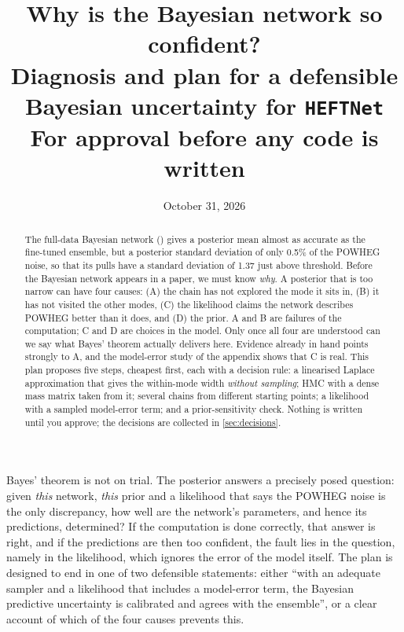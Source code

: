 
\newcommand{\what}{\hat{\boldsymbol{\omega}}}

\title{\textbf{Why is the Bayesian network so confident?}\\[4pt]
\large Diagnosis and plan for a defensible Bayesian uncertainty for \texttt{HEFTNet}\\[4pt]
\normalsize For approval before any code is written}
\date{October 31, 2026}


\maketitle

\begin{abstract}
\noindent
The full-data Bayesian network () gives a posterior mean
almost as accurate as the fine-tuned ensemble, but a posterior standard deviation of only
0.5\% of the POWHEG noise, so that its pulls have a standard deviation of 1.37 just above
threshold. Before the Bayesian network appears in a paper, we must know \emph{why}. A
posterior that is too narrow can have four causes: (A) the chain has not explored the mode
it sits in, (B) it has not visited the other modes, (C) the likelihood claims the network
describes POWHEG better than it does, and (D) the prior. A and B are failures of the
computation; C and D are choices in the model. Only once all four are understood can we
say what Bayes' theorem actually delivers here. Evidence already in hand points strongly to
A, and the model-error study of the appendix shows that C is real. This plan proposes five
steps, cheapest first, each with a decision rule: a linearised Laplace approximation that
gives the within-mode width \emph{without sampling}; HMC with a dense mass matrix taken from
it; several chains from different starting points; a likelihood with a sampled model-error
term; and a prior-sensitivity check. Nothing is written until you approve; the decisions
are collected in \cref{sec:decisions}.
\end{abstract}

\begin{keyidea}
Bayes' theorem is not on trial. The posterior answers a precisely posed question: given
\emph{this} network, \emph{this} prior and a likelihood that says the POWHEG noise is the
only discrepancy, how well are the network's parameters, and hence its predictions,
determined? If the computation is done correctly, that answer is right, and if the
predictions are then too confident, the fault lies in the question, namely in the
likelihood, which ignores the error of the model itself. The plan is designed to end in one
of two defensible statements: either ``with an adequate sampler and a likelihood that
includes a model-error term, the Bayesian predictive uncertainty is calibrated and agrees
with the ensemble'', or a clear account of which of the four causes prevents this.
\end{keyidea}

